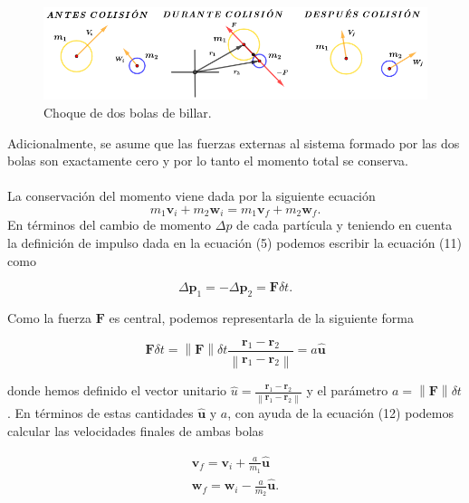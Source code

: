 \documentclass{article}
\newcommand{\norm}[1]{\left\lVert#1\right\rVert}
\begin{document}
\begin{figure}[h]
\includegraphics[width=\linewidth]{colision.png}
\caption{Choque de dos bolas de billar.}
\end{figure}

Adicionalmente, se asume que las fuerzas externas al sistema formado por las dos bolas son exactamente cero y por lo tanto el momento total se conserva.\\\\La conservación del momento viene dada por la siguiente ecuación
\begin{equation}
    m_1\textbf{v}_{i}+m_2\textbf{w}_{i}=m_1\textbf{v}_{f}+m_2\textbf{w}_{f}.
\end{equation}
En términos del cambio de momento $\Delta p$ de cada partícula y teniendo en cuenta la definición de impulso dada en la ecuación (5) podemos escribir la ecuación (11) como

\begin{equation}
    \Delta \textbf{p}_{1}=-\Delta \textbf{p}_{2}=\textbf{F}\delta t.
\end{equation}

Como la fuerza $\textbf{F}$ es central, podemos representarla de la siguiente forma

\begin{equation}
    \textbf{F}\delta t=\norm{\textbf{F}}\delta t\frac{\textbf{r}_{1}-\textbf{r}_{2}}{\norm{\textbf{r}_{1}-\textbf{r}_{2}}}=a\hat{\textbf{u}}
\end{equation}

donde hemos definido el vector unitario $\hat{u}=\frac{\textbf{r}_{1}-\textbf{r}_{2}}{\norm{\textbf{r}_{1}-\textbf{r}_{2}}}$ y el parámetro $a=\norm{\textbf{F}}\delta t$. En términos de estas cantidades $\hat{\textbf{{u}}}$ y $a$, con ayuda de la ecuación (12) podemos calcular las velocidades finales de ambas bolas

\begin{gather}
    \textbf{v}_{f}=\textbf{v}_{i}+\frac{a}{m_1}\hat{\textbf{u}} \\ 
    \textbf{w}_{f}=\textbf{w}_{i}-\frac{a}{m_2}\hat{\textbf{u}}.
\end{gather}
\end{document}
